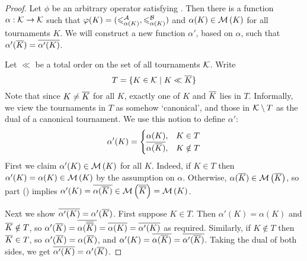 \begin{proof}
    Let $\phi$ be an arbitrary operator satisfying . Then
    there is a function $\alpha: \mathcal{K} \to \mathcal{K}$ such that $\varphi(K) =
    ({\leqslant^{\mathcal{A}}_{\alpha(K)}}, {\leqslant^{\mathcal{B}}_{\alpha(K)}})$ and $\alpha(K) \in \operatorname{\mathcal{M}}\left({K}\right)$
    for all tournaments $K$. We will construct a new function $\alpha'$, based
    on $\alpha$, such that $\alpha'({\overline{K}}) = {\overline{\alpha'(K)}}$.

    Let $\ll$ be a total order on the set of all tournaments
    $\mathcal{K}$.\footnotemark{} Write
    \[
        T = \{K \in \mathcal{K} \mid K \ll {\overline{K}}\}
    \]
    Note that since $K \ne {\overline{K}}$ for all $K$, exactly one of $K$ and
    ${\overline{K}}$ lies in $T$. Informally, we view the tournaments in $T$ as
    somehow `canonical', and those in $\mathcal{K} \setminus T$ as the dual of a
    canonical tournament. We use this notion to define $\alpha'$:
    \[
        \alpha'(K) = \begin{cases}
            \alpha(K),& K \in T \\
            {\overline{\alpha({\overline{K}})}},& K \notin T
        \end{cases}
    \]
    First we claim $\alpha'(K) \in \operatorname{\mathcal{M}}\left({K}\right)$ for all $K$. Indeed, if $K \in T$
    then $\alpha'(K) = \alpha(K) \in \operatorname{\mathcal{M}}\left({K}\right)$ by the assumption on $\alpha$.
    Otherwise, $\alpha({\overline{K}}) \in \operatorname{\mathcal{M}}\left({{\overline{K}}}\right)$, so
     part ()
    implies $\alpha'(K) = {\overline{\alpha({\overline{K}})}} \in \operatorname{\mathcal{M}}\left({{\overline{{\overline{K}}}}}\right) =
    \operatorname{\mathcal{M}}\left({K}\right)$.

    Next we show ${\overline{\alpha'(K)}} = \alpha'({\overline{K}})$. First suppose $K \in
    T$. Then $\alpha'(K) = \alpha(K)$ and ${\overline{K}} \notin T$, so
    $\alpha'({\overline{K}}) = {\overline{\alpha({\overline{{\overline{K}}}})}} = {\overline{\alpha(K)}} =
    {\overline{\alpha'(K)}}$ as required. Similarly, if $K \notin T$ then ${\overline{K}}
    \in T$, so $\alpha'({\overline{K}}) = \alpha({\overline{K}})$, and $\alpha'(K) =
    {\overline{\alpha({\overline{K}})}} = {\overline{\alpha'({\overline{K}})}}$. Taking the dual of
    both sides, we get ${\overline{\alpha'(K)}} = \alpha'({\overline{K}})$.


\end{proof}
